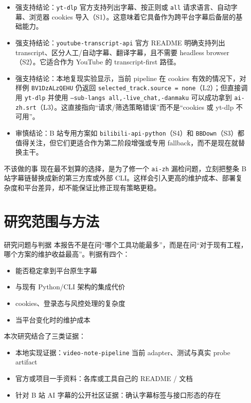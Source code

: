 \documentclass[a4paper]{article}
\begin{document}
\begin{itemize}
\item 强支持结论：\texttt{yt-dlp} 官方支持列出字幕、按正则或 \texttt{all} 请求语言、自动字幕、浏览器 cookies 导入（S1）。这意味着它具备作为跨平台字幕后备层的基础能力。
\item 强支持结论：\texttt{youtube-transcript-api} 官方 README 明确支持列出 transcript、区分人工/自动字幕、翻译字幕，且不需要 headless browser（S2）。它适合作为 YouTube 的 transcript-first 路径。
\item 强支持结论：本地复现实验显示，当前 pipeline 在 cookies 有效的情况下，对样例 \texttt{BV1DzALzQEHU} 仍返回 \texttt{selected\_track.source = none}（L2）；但直接调用 \texttt{yt-dlp} 并使用 \texttt{--sub-langs all,-live\_chat,-danmaku} 可以成功拿到 \texttt{ai-zh.srt}（L3）。这直接指向“请求/筛选策略错误”而不是“cookies 或 yt-dlp 不可用”。
\item 审慎结论：B 站专用方案如 \texttt{bilibili-api-python}（S4）和 \texttt{BBDown}（S3）都值得关注，但它们更适合作为第二阶段增强或专用 fallback，而不是现在就替换主干。
\end{itemize}

\begin{riskbox}{不该做的事}
现在最不划算的选择，是为了修一个 \texttt{ai-zh} 漏检问题，立刻把整条 B 站字幕链替换成新的第三方库或外部 CLI。这样会引入更高的维护成本、部署复杂度和平台差异，却不能保证比修正现有策略更稳。
\end{riskbox}

\section{研究范围与方法}

\begin{methodbox}{研究问题与判据}
本报告不是在问“哪个工具功能最多”，而是在问“对于现有工程，哪个方案的维护收益最高”。判据有四个：
\begin{itemize}
\item 能否稳定拿到平台原生字幕
\item 与现有 Python/CLI 架构的集成代价
\item cookies、登录态与风控处理的复杂度
\item 当平台变化时的维护成本
\end{itemize}
\end{methodbox}

本次研究结合了三类证据：
\begin{itemize}
\item 本地实现证据：\texttt{video-note-pipeline} 当前 adapter、测试与真实 probe artifact
\item 官方或项目一手资料：各库或工具自己的 README / 文档
\item 针对 B 站 AI 字幕的公开社区证据：确认字幕标签与接口形态的存在
\end{itemize}
\end{document}
